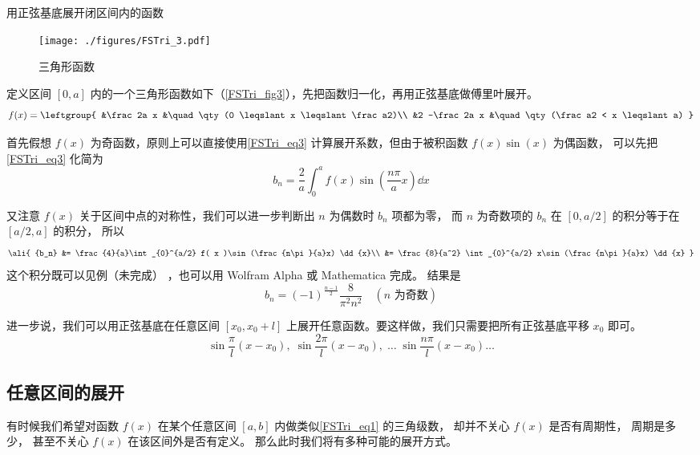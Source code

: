 \begin{example}{用正弦基底展开闭区间内的函数}\label{FSTri_ex2}

\begin{figure}[ht]
\centering
\texttt{[image: ./figures/FSTri\_3.pdf]}
\caption{三角形函数} \label{FSTri_fig3}
\end{figure}

定义区间 $[0,a]$ 内的一个三角形函数如下（\autoref{FSTri_fig3}），先把函数归一化，再用正弦基底做傅里叶展开。
\begin{equation}
f(x) = \leftgroup{
&\frac2a x &\quad \qty(0 \leqslant x \leqslant \frac a2)\\
&2 -\frac2a x &\quad \qty(\frac a2 < x \leqslant a)
}\end{equation}

首先假想 $f(x)$ 为奇函数，原则上可以直接使用\autoref{FSTri_eq3} 计算展开系数，但由于被积函数 $f(x)\sin(x)$ 为偶函数， 可以先把\autoref{FSTri_eq3} 化简为%
\begin{equation}
{b_n} = \frac{2}{a}\int_{0}^a f( x )\sin (\frac{n\pi}{a}x) \dd{x}
\end{equation}

又注意 $f(x)$ 关于区间中点的对称性，我们可以进一步判断出 $n$ 为偶数时 $b_n$ 项都为零， 而 $n$ 为奇数项的 $b_n$ 在 $[0, a/2]$ 的积分等于在 $[a/2, a]$ 的积分， 所以
\begin{equation}
\ali{
{b_n} &= \frac{4}{a}\int_{0}^{a/2} f( x )\sin (\frac{n\pi}{a}x) \dd{x}\\
&= \frac{8}{a^2} \int_{0}^{a/2} x\sin (\frac{n\pi}{a}x) \dd{x}
}\end{equation}
这个积分既可以见例（未完成）
，也可以用 Wolfram Alpha 或 Mathematica 完成。%
结果是
\begin{equation}
b_n = (-1)^{\frac{n-1}{2}} \frac{8}{\pi^2 n^2} \quad (\text{$n$ 为奇数})
\end{equation}
\end{example}
进一步说，我们可以用正弦基底在任意区间 $[x_0,x_0+l]$ 上展开任意函数。要这样做，我们只需要把所有正弦基底平移 $x_0$ 即可。
\begin{equation}
\sin\frac{\pi}{l} (x-x_0),\;   \sin\frac{2\pi}{l} (x-x_0),\;    \dots\;\sin\frac{n\pi}{l} (x-x_0) \dots
\end{equation}

\subsection{任意区间的展开}\label{FSTri_sub2}
有时候我们希望对函数 $f(x)$ 在某个任意区间 $[a, b]$ 内做类似\autoref{FSTri_eq1} 的三角级数， 却并不关心 $f(x)$ 是否有周期性， 周期是多少， 甚至不关心 $f(x)$ 在该区间外是否有定义。 那么此时我们将有多种可能的展开方式。

